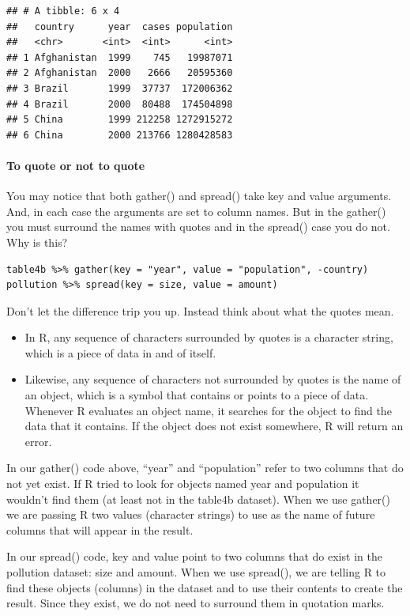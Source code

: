 \documentclass[
]{article}
\providecommand{\tightlist}{%
  \setlength{\itemsep}{0pt}\setlength{\parskip}{0pt}}
\begin{document}
\begin{verbatim}
## # A tibble: 6 x 4
##   country      year  cases population
##   <chr>       <int>  <int>      <int>
## 1 Afghanistan  1999    745   19987071
## 2 Afghanistan  2000   2666   20595360
## 3 Brazil       1999  37737  172006362
## 4 Brazil       2000  80488  174504898
## 5 China        1999 212258 1272915272
## 6 China        2000 213766 1280428583
\end{verbatim}

\hypertarget{to-quote-or-not-to-quote}{%
\paragraph{To quote or not to quote}\label{to-quote-or-not-to-quote}}

You may notice that both gather() and spread() take key and value
arguments. And, in each case the arguments are set to column names. But
in the gather() you must surround the names with quotes and in the
spread() case you do not. Why is this?

\begin{verbatim}
table4b %>% gather(key = "year", value = "population", -country)
pollution %>% spread(key = size, value = amount)
\end{verbatim}

Don't let the difference trip you up. Instead think about what the
quotes mean.

\begin{itemize}
\tightlist
\item
  In R, any sequence of characters surrounded by quotes is a character
  string, which is a piece of data in and of itself.
\item
  Likewise, any sequence of characters not surrounded by quotes is the
  name of an object, which is a symbol that contains or points to a
  piece of data. Whenever R evaluates an object name, it searches for
  the object to find the data that it contains. If the object does not
  exist somewhere, R will return an error.
\end{itemize}

In our gather() code above, ``year'' and ``population'' refer to two
columns that do not yet exist. If R tried to look for objects named year
and population it wouldn't find them (at least not in the table4b
dataset). When we use gather() we are passing R two values (character
strings) to use as the name of future columns that will appear in the
result.

In our spread() code, key and value point to two columns that do exist
in the pollution dataset: size and amount. When we use spread(), we are
telling R to find these objects (columns) in the dataset and to use
their contents to create the result. Since they exist, we do not need to
surround them in quotation marks.
\end{document}
